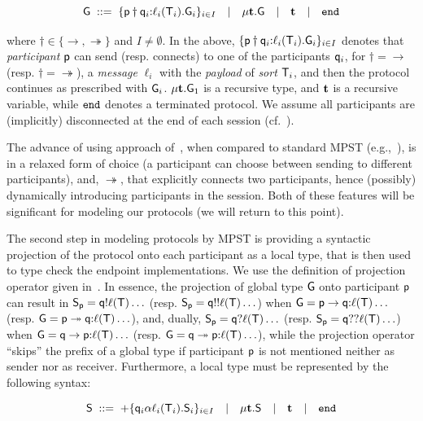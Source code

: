 \begin{equation}
	{\sf G} \; ::= \;
	\{{\sf p}\dagger{\sf q}_i{:}\ell_i({\mathsf T}_i).{\sf G}_i\}_{i\in I}  \quad | \quad 
	\mu \textbf{t}.{\sf G} \quad | \quad 
	\textbf{t} \quad | \quad
	\mathtt{end}
\end{equation}

where $\dagger\in\{\to, \twoheadrightarrow\}$ and $I\not=\emptyset$. 
In the above, $\{{\sf p}\dagger{\sf q}_i{:}\ell_i({\mathsf T}_i).{\sf G}_i\}_{i\in I}$
denotes that \emph{participant} ${\sf p}$ can send (resp. connects) to one of the participants ${\sf q}_i$, 
for $\dagger=\to$ (resp. $\dagger=\twoheadrightarrow$), 
a \emph{message} $\ell_i$ with the \emph{payload} of \emph{sort} ${\mathsf T}_i$, 
and then the protocol continues as prescribed with ${\sf G}_i$.  
$\mu \textbf{t}.{\sf G}_1$ is a recursive type, and $\textbf{t}$ is a recursive variable, 
while $\mathtt{end}$ denotes a terminated protocol. We assume all participants are (implicitly) disconnected at the end of each session (cf.~\cite{HuY17}). 

The advance of using approach of~\cite{HuY17}, when compared to standard MPST (e.g.,~\cite{HondaYC08}),
is in a relaxed form of choice (a participant can choose between sending to different participants), 
and, $\twoheadrightarrow$, that explicitly connects two participants, hence (possibly) dynamically 
introducing participants in the session.
Both of these features will be significant for modeling our protocols (we will return to this point).

The second step in modeling protocols by MPST is providing a syntactic projection of the protocol onto each participant as a local type, that is then used to
type check the endpoint implementations.  
We use the definition of projection operator given in~\cite[Figure \ref{fig:fig2}]{HuY17}. 
In essence, the projection of global type ${\sf G}$ onto participant ${\sf p}$ can result in 
${\mathsf S}_{\sf p}={\sf q}{!}\ell({\mathsf T})\ldots$ (resp. ${\mathsf S}_{\sf p}={\sf q}{!!}\ell({\mathsf T})\ldots$) 
when ${\sf G}={\sf p}\to{\sf q}{:}\ell({\mathsf T})\ldots$ (resp. ${\sf G}={\sf p}\twoheadrightarrow{\sf q}{:}\ell({\mathsf T})\ldots$), 
and, dually, ${\mathsf S}_{\sf p}={\sf q}{?}\ell({\mathsf T})\ldots$ (resp. ${\mathsf S}_{\sf p}={\sf q}{??}\ell({\mathsf T})\ldots$) when ${\sf G}={\sf q}\to{\sf p}{:}\ell({\mathsf T})\ldots$ 
(resp. ${\sf G}={\sf q}\twoheadrightarrow{\sf p}{:}\ell({\mathsf T})\ldots$), 
while the projection operator ``skips'' the prefix of a global type if participant ${\sf p}$ is not mentioned neither as sender nor as receiver. Furthermore, a local type must be represented by the following syntax:

\begin{equation}
	{\mathsf S} \; ::= \; 
	{+}\{{\sf q}_i\alpha\ell_i({\mathsf T}_i).{\mathsf S}_i\}_{i\in I}  \quad | \quad 
	\mu \textbf{t}.{\mathsf S} \quad | \quad 
	\textbf{t} \quad | \quad
	\mathtt{end}
\end{equation}

